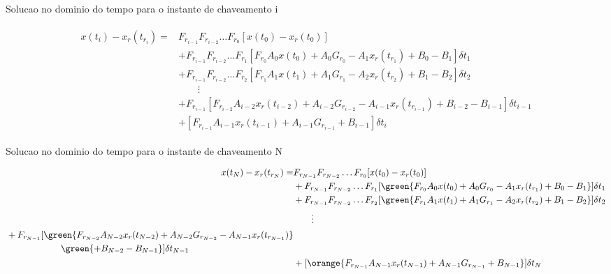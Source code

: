 
Solucao no dominio do tempo para o instante de chaveamento i

\begin{align}
	\begin{split}
		x(t_i) - x_r(t_{r_i}) =  & F_{r_{i-1}}F_{r_{i-2}} \ldots F_{r_0} [x(t_0) - x_r(t_0)] \\
								 & + F_{r_{i-1}}F_{r_{i-2}} \ldots F_{r_1} [F_{r_0} A_0 x(t_0) + A_0 G_{r_0} - A_1 x_r(t_{r_1}) + B_0 - B_1] \delta t_1 \\
								 & + F_{r_{i-1}}F_{r_{i-2}} \ldots F_{r_2} [F_{r_1} A_1 x(t_1) + A_1 G_{r_1} - A_2 x_r(t_{r_2}) + B_1 - B_2] \delta t_2 \\
								 & \qquad \vdots \\
								 & + F_{r_{i-1}}[F_{r_{i-2}} A_{i-2} x_r(t_{i-2}) + A_{i-2} G_{r_{i-2}} - A_{i-1} x_r(t_{r_{i-1}}) + B_{i-2} - B_{i-1} ] \delta t_{i-1} \\
							     & + [F_{r_{i-1}} A_{i-1} x_r(t_{i-1}) + A_{i-1} G_{r_{i-1}} + B_{i-1}] \delta t_i
	\end{split}
\end{align}


Solucao no dominio do tempo para o instante de chaveamento N

\begin{align}
		x(t_N) - x_r(t_{r_N}) =  & F_{r_{N-1}}F_{r_{N-2}} \ldots F_{r_0} [x(t_0) - x_r(t_0)] \nonumber \\
								 & + F_{r_{N-1}}F_{r_{N-2}} \ldots F_{r_1} [\green{F_{r_0} A_0 x(t_0) + A_0 G_{r_0} - A_1 x_r(t_{r_1}) + B_0 - B_1}] \delta t_1 \nonumber \\
								 & + F_{r_{N-1}}F_{r_{N-2}} \ldots F_{r_2} [\green{F_{r_1} A_1 x(t_1) + A_1 G_{r_1} - A_2 x_r(t_{r_2}) + B_1 - B_2}] \delta t_2 \nonumber \\
								 & \qquad \vdots \nonumber \\
								 \begin{split}
									& + F_{r_{N-1}}[\green{F_{r_{N-2}} A_{N-2} x_r(t_{N-2}) + A_{N-2} G_{r_{N-2}} - A_{N-1} x_r(t_{r_{N-1}})} \\ 
									& \qquad \qquad \qquad \green{+ B_{N-2} - B_{N-1}} ] \delta t_{N-1}
								 \end{split} \nonumber \\
							     & + [\orange{F_{r_{N-1}} A_{N-1} x_r(t_{N-1}) + A_{N-1} G_{r_{N-1}} + B_{N-1}}] \delta t_N
\end{align}

